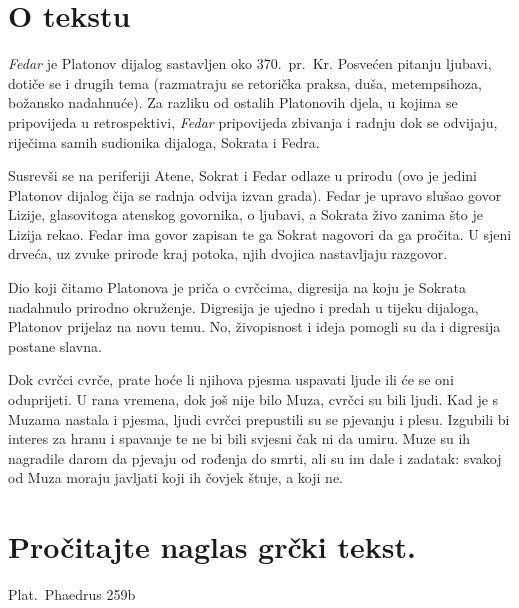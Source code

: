 


\section*{O tekstu}

\textit{Fedar} je Platonov dijalog sastavljen oko 370.\ pr.~Kr. Posvećen pitanju ljubavi, dotiče se i drugih tema (razmatraju se retorička praksa, duša, metempsihoza, božansko nadahnuće). Za razliku od ostalih Platonovih djela, u kojima se pripovijeda u retrospektivi, \textit{Fedar} pripovijeda zbivanja i radnju dok se odvijaju, riječima samih sudionika dijaloga, Sokrata i Fedra.

Susrevši se na periferiji Atene, Sokrat i Fedar odlaze u prirodu (ovo je jedini Platonov dijalog čija se radnja odvija izvan grada). Fedar je upravo slušao govor Lizije, glasovitoga atenskog govornika, o ljubavi, a Sokrata živo zanima što je Lizija rekao. Fedar ima govor zapisan te ga Sokrat nagovori da ga pročita. U sjeni drveća, uz zvuke prirode kraj potoka, njih dvojica nastavljaju razgovor. 

Dio koji čitamo Platonova je priča o cvrčcima, digresija na koju je Sokrata nadahnulo prirodno okruženje. Digresija je ujedno i predah u tijeku dijaloga, Platonov prijelaz na novu temu. No, živopisnost i ideja pomogli su da i digresija postane slavna. 

Dok cvrčci cvrče, prate hoće li njihova pjesma uspavati ljude ili će se oni oduprijeti. U rana vremena, dok još nije bilo Muza, cvrčci su bili ljudi. Kad je s Muzama nastala i pjesma, ljudi cvrčci prepustili su se pjevanju i plesu. Izgubili bi interes za hranu i spavanje te ne bi bili svjesni čak ni da umiru. Muze su ih nagradile darom da pjevaju od rođenja do smrti, ali su im dale i zadatak: svakoj od Muza moraju javljati koji ih čovjek štuje, a koji ne.


\newpage

\section*{Pročitajte naglas grčki tekst.}

Plat.\ Phaedrus 259b


\medskip


